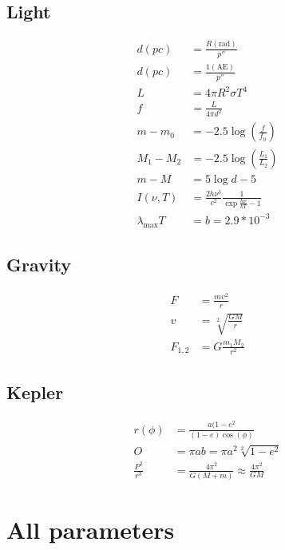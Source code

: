 \documentclass[12pt,a4paper]{article}
\begin{document}
\subsection*{Light}
\begin{align}
	\nonumber d(pc) &= \frac{R(\text{rad})}{p''} \\
	d(pc) &= \frac{1 (\text{AE})}{p''} \\
 	L &= 4 \pi R^2 \sigma T^4 	\label{eq:luminosity} \\
 	f &= \frac{L}{4 \pi d^2} \label{eq:flux}\\
	\nonumber m - m_0&= -2.5 \log(\frac{f}{f_0}) \\
	\nonumber M_1 - M_2 &= -2.5 \log(\frac{L_1}{L_2}) \\
	m - M &= 5 \log d - 5 \label{eq:distance_modules} \\
	I(\nu, T) &= \frac{2 h \nu^3}{c^2} \frac{1}{\exp{\frac{h \nu}{k T} - 1}} \label{eq:planck_light}\\
	\lambda_{\text{max}}  T &= b = 2.9*10^{-3} \label{eq:Wien}
\end{align}

\subsection*{Gravity}
\begin{align}
    F &= \frac{m v^2}{r} \\
	v &= \sqrt[2]{\frac{G M}{r}} \label{eq:middelpuntzoekendekracht} \\
	F_{1,2} &= G \frac{m_1 M_2}{r^2} \label{eq:gravity}
\end{align}

\subsection*{Kepler}
\begin{align}
    r(\phi) &= \frac{a (1-e^2}{(1 - e) \cos(\phi)} \\
	O &= \pi a b = \pi a^2 \sqrt[2]{1 - e^2} \\
	\frac{P^2}{r^3} &= \frac{4 \pi^2}{G (M + m)} \approx \frac{4 \pi^2}{G M}
\end{align}
\newpage
\section{All parameters}
\end{document}
